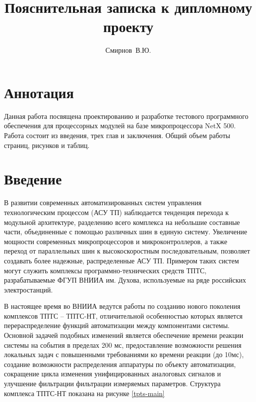 \documentclass[a4paper,14pt,bachelor]{disser}
\title{Пояснительная записка к дипломному проекту}
\author{Смирнов~В.Ю.}
\begin{document}
\maketitle %
\setcounter{page}{2} %
\chapter*{Аннотация} %
Данная работа посвящена проектированию и разработке тестового программного обеспечения для процессорных модулей на базе микропроцессора NetX 500. Работа состоит из введения, трех глав и заключения. Общий объем работы \pageref{LastPage} страниц,  рисунков и  таблиц.

\tableofcontents{} %

\chapter{Введение}
В развитии современных автоматизированных систем управления технологическим процессом (АСУ ТП) наблюдается тенденция перехода к модульной архитектуре, разделению всего комплекса на небольшие составные части, объединенные с помощью различных шин в единую систему. Увеличение мощности современных микропроцессоров и микроконтроллеров, а также переход от параллельных шин к высокоскоростным последовательным, позволяет создавать более надежные, распределенные АСУ ТП. Примером таких систем могут служить комплексы программно-технических средств ТПТС, разрабатываемые ФГУП ВНИИА им. Духова, используемые на ряде российских электростанций.

В настоящее время во ВНИИА ведутся работы по созданию нового поколения комплексов ТПТС -- ТПТС-НТ, отличительной особенностью которых является перераспределение функций автоматизации между компонентами системы. Основной задачей подобных изменений является обеспечение времени реакции системы на события в пределах 200 мс, предоставление возможности решения локальных задач с повышенными требованиями ко времени реакции (до 10мс), создание возможности распределения аппаратуры по объекту автоматизации, сокращение цикла изменения унифицированных аналоговых сигналов и улучшение фильтрации фильтрации измеряемых параметров. Структура комплекса ТПТС-НТ показана на рисунке \ref{tpts-main} %
\end{document}
